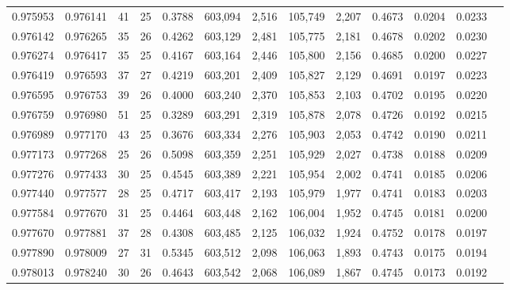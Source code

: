 \begin{tabular}{rrrrrrrrrrrrr}
0.975953 & 0.976141 &    41 &  25 &                                     0.3788 & 603,094 &   2,516 & 105,749 &   2,207 & 0.4673 & 0.0204 & 0.0233 \\
0.976142 & 0.976265 &    35 &  26 &                                     0.4262 & 603,129 &   2,481 & 105,775 &   2,181 & 0.4678 & 0.0202 & 0.0230 \\
0.976274 & 0.976417 &    35 &  25 &                                     0.4167 & 603,164 &   2,446 & 105,800 &   2,156 & 0.4685 & 0.0200 & 0.0227 \\
0.976419 & 0.976593 &    37 &  27 &                                     0.4219 & 603,201 &   2,409 & 105,827 &   2,129 & 0.4691 & 0.0197 & 0.0223 \\
0.976595 & 0.976753 &    39 &  26 &                                     0.4000 & 603,240 &   2,370 & 105,853 &   2,103 & 0.4702 & 0.0195 & 0.0220 \\
0.976759 & 0.976980 &    51 &  25 &                                     0.3289 & 603,291 &   2,319 & 105,878 &   2,078 & 0.4726 & 0.0192 & 0.0215 \\
0.976989 & 0.977170 &    43 &  25 &                                     0.3676 & 603,334 &   2,276 & 105,903 &   2,053 & 0.4742 & 0.0190 & 0.0211 \\
0.977173 & 0.977268 &    25 &  26 &                                     0.5098 & 603,359 &   2,251 & 105,929 &   2,027 & 0.4738 & 0.0188 & 0.0209 \\
0.977276 & 0.977433 &    30 &  25 &                                     0.4545 & 603,389 &   2,221 & 105,954 &   2,002 & 0.4741 & 0.0185 & 0.0206 \\
0.977440 & 0.977577 &    28 &  25 &                                     0.4717 & 603,417 &   2,193 & 105,979 &   1,977 & 0.4741 & 0.0183 & 0.0203 \\
0.977584 & 0.977670 &    31 &  25 &                                     0.4464 & 603,448 &   2,162 & 106,004 &   1,952 & 0.4745 & 0.0181 & 0.0200 \\
0.977670 & 0.977881 &    37 &  28 &                                     0.4308 & 603,485 &   2,125 & 106,032 &   1,924 & 0.4752 & 0.0178 & 0.0197 \\
0.977890 & 0.978009 &    27 &  31 &                                     0.5345 & 603,512 &   2,098 & 106,063 &   1,893 & 0.4743 & 0.0175 & 0.0194 \\
0.978013 & 0.978240 &    30 &  26 &                                     0.4643 & 603,542 &   2,068 & 106,089 &   1,867 & 0.4745 & 0.0173 & 0.0192 \\

\end{tabular}
